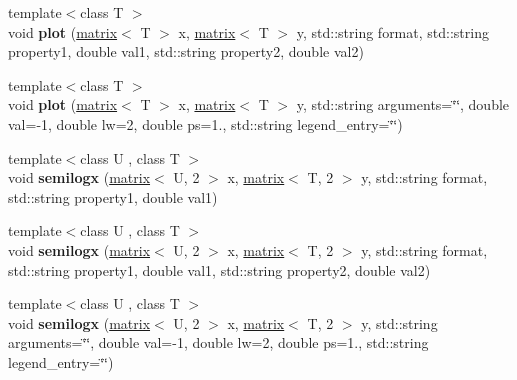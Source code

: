 \begin{DoxyCompactItemize}
\item 
\hypertarget{classkeycpp_1_1_figure_a9000f7c76f21a37d4c70bee3103fe623}{{\footnotesize template$<$class T $>$ }\\void {\bfseries plot} (\hyperlink{classkeycpp_1_1matrix}{matrix}$<$ T $>$ x, \hyperlink{classkeycpp_1_1matrix}{matrix}$<$ T $>$ y, std\-::string format, std\-::string property1, double val1, std\-::string property2, double val2)}\label{classkeycpp_1_1_figure_a9000f7c76f21a37d4c70bee3103fe623}

\item 
\hypertarget{classkeycpp_1_1_figure_a79f823ad4b62e20a85c9f1270e65fb01}{{\footnotesize template$<$class T $>$ }\\void {\bfseries plot} (\hyperlink{classkeycpp_1_1matrix}{matrix}$<$ T $>$ x, \hyperlink{classkeycpp_1_1matrix}{matrix}$<$ T $>$ y, std\-::string arguments=\char`\"{}\char`\"{}, double val=-\/1, double lw=2, double ps=1., std\-::string legend\-\_\-entry=\char`\"{}\char`\"{})}\label{classkeycpp_1_1_figure_a79f823ad4b62e20a85c9f1270e65fb01}

\item 
\hypertarget{classkeycpp_1_1_figure_abb17cbe25d4a069d59a106e525907030}{{\footnotesize template$<$class U , class T $>$ }\\void {\bfseries semilogx} (\hyperlink{classkeycpp_1_1matrix}{matrix}$<$ U, 2 $>$ x, \hyperlink{classkeycpp_1_1matrix}{matrix}$<$ T, 2 $>$ y, std\-::string format, std\-::string property1, double val1)}\label{classkeycpp_1_1_figure_abb17cbe25d4a069d59a106e525907030}

\item 
\hypertarget{classkeycpp_1_1_figure_aa670d5837e21be5db622e3662708bee0}{{\footnotesize template$<$class U , class T $>$ }\\void {\bfseries semilogx} (\hyperlink{classkeycpp_1_1matrix}{matrix}$<$ U, 2 $>$ x, \hyperlink{classkeycpp_1_1matrix}{matrix}$<$ T, 2 $>$ y, std\-::string format, std\-::string property1, double val1, std\-::string property2, double val2)}\label{classkeycpp_1_1_figure_aa670d5837e21be5db622e3662708bee0}

\item 
\hypertarget{classkeycpp_1_1_figure_ae851925e0412f639ab6e4f154508d4a1}{{\footnotesize template$<$class U , class T $>$ }\\void {\bfseries semilogx} (\hyperlink{classkeycpp_1_1matrix}{matrix}$<$ U, 2 $>$ x, \hyperlink{classkeycpp_1_1matrix}{matrix}$<$ T, 2 $>$ y, std\-::string arguments=\char`\"{}\char`\"{}, double val=-\/1, double lw=2, double ps=1., std\-::string legend\-\_\-entry=\char`\"{}\char`\"{})}\label{classkeycpp_1_1_figure_ae851925e0412f639ab6e4f154508d4a1}


\end{DoxyCompactItemize}
